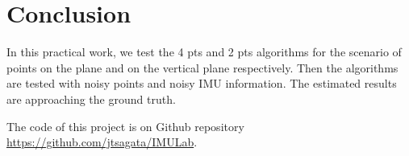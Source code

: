 \documentclass[a4paper,12pt]{article}
\begin{document}
\section{Conclusion}
In this practical work, we test the 4 pts and 2 pts algorithms for the scenario
of points on the plane and on the vertical plane respectively. Then the
algorithms are tested with noisy points and noisy IMU information. The
estimated results are approaching the ground truth.

The code of this project is on Github repository \url{https://github.com/jtsagata/IMULab}.

\clearpage
\end{document}
